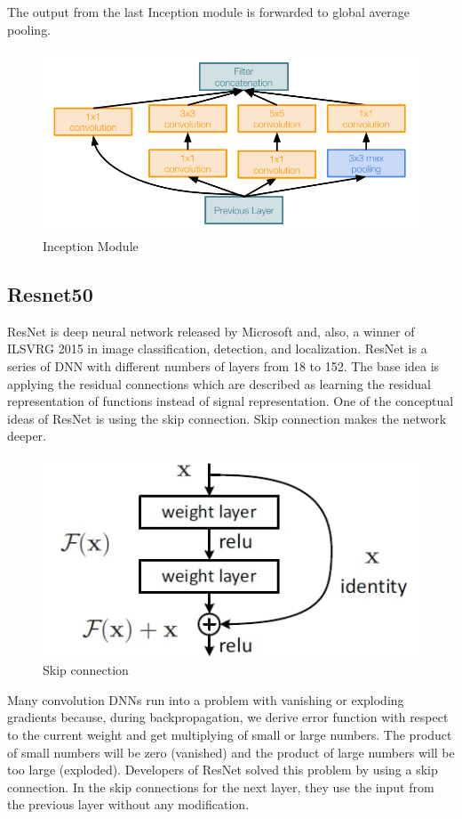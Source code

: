 \documentclass[titlepage]{report}
\begin{document}
The output from the last Inception module is forwarded to global average pooling.

\begin{figure}[h!]
    \centering
    \includegraphics[scale=0.4]{googlenet}
    \caption{Inception Module}
\end{figure}

\subsection{Resnet50}
ResNet is deep neural network released by Microsoft and, also, a winner of ILSVRG 2015 in image classification, detection, and localization. ResNet is a series of DNN with different numbers of layers from 18 to 152. The base idea is applying the residual connections which are described as learning the residual representation of functions instead of signal representation. One of the conceptual ideas of ResNet is using the skip connection. Skip connection makes the network deeper.  
\begin{figure}[h!]
    \centering
    \includegraphics[scale=0.4]{resnet_1}
    \caption{Skip connection}
\end{figure}

Many convolution DNNs run into a problem with vanishing or exploding gradients because, during backpropagation, we derive error function with respect to the current weight and get multiplying of small or large numbers. The product of small numbers will be zero (vanished) and the product of large numbers will be too large (exploded). Developers of ResNet solved this problem by using a skip connection. In the skip connections for the next layer, they use the input from the previous layer without any modification. 
\end{document}
